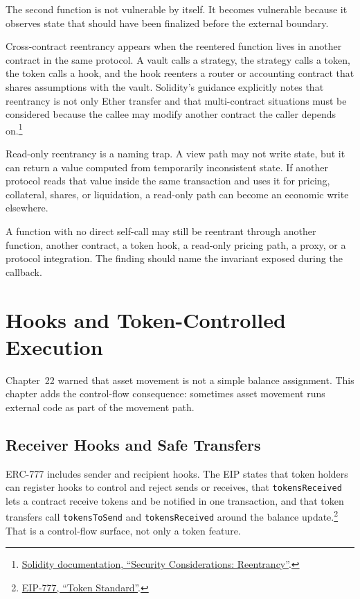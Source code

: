 The second function is not vulnerable by itself. It becomes vulnerable because it observes state that should have been finalized before the external boundary.

Cross-contract reentrancy appears when the reentered function lives in another contract in the same protocol. A vault calls a strategy, the strategy calls a token, the token calls a hook, and the hook reenters a router or accounting contract that shares assumptions with the vault. Solidity's guidance explicitly notes that reentrancy is not only Ether transfer and that multi-contract situations must be considered because the callee may modify another contract the caller depends on.\footnote{\href{https://docs.soliditylang.org/en/latest/security-considerations.html\#reentrancy}{Solidity documentation, ``Security Considerations: Reentrancy''}.}

Read-only reentrancy is a naming trap. A view path may not write state, but it can return a value computed from temporarily inconsistent state. If another protocol reads that value inside the same transaction and uses it for pricing, collateral, shares, or liquidation, a read-only path can become an economic write elsewhere.

\begin{failuremodebox}
A function with no direct self-call may still be reentrant through another function, another contract, a token hook, a read-only pricing path, a proxy, or a protocol integration. The finding should name the invariant exposed during the callback.
\end{failuremodebox}

\section{Hooks and Token-Controlled Execution}

Chapter~22 warned that asset movement is not a simple balance assignment. This chapter adds the control-flow consequence: sometimes asset movement runs external code as part of the movement path.

\subsection{Receiver Hooks and Safe Transfers}

ERC-777 includes sender and recipient hooks. The EIP states that token holders can register hooks to control and reject sends or receives, that \texttt{tokensReceived} lets a contract receive tokens and be notified in one transaction, and that token transfers call \texttt{tokensToSend} and \texttt{tokensReceived} around the balance update.\footnote{\href{https://eips.ethereum.org/EIPS/eip-777}{EIP-777, ``Token Standard''}.} That is a control-flow surface, not only a token feature.

